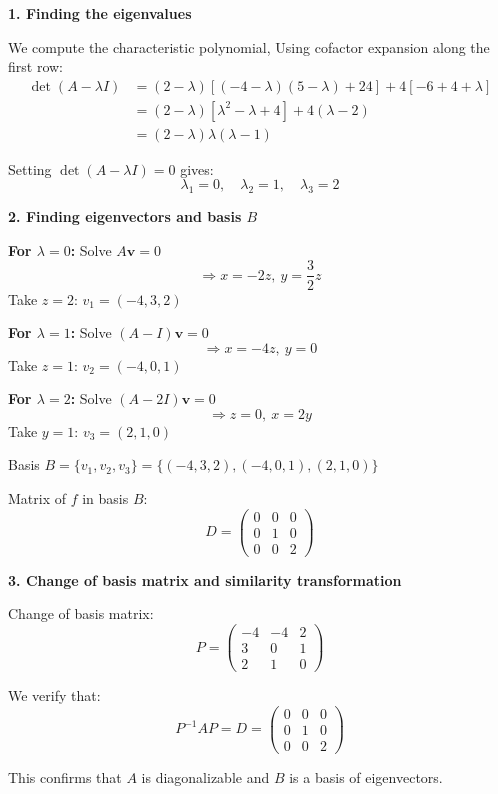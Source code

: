 \documentclass[12pt]{article}
\begin{document}
\begin{correctionbox}
    \noindent \textbf{1. Finding the eigenvalues}

We compute the characteristic polynomial, Using cofactor expansion along the first row:
\begin{align*}
\det(A - \lambda I) &= (2-\lambda)\left[(-4-\lambda)(5-\lambda) + 24\right] + 4\left[-6 + 4 + \lambda\right] \\
&= (2-\lambda)\left[\lambda^2 - \lambda + 4\right] + 4(\lambda - 2) \\
&= (2-\lambda)\lambda(\lambda - 1)
\end{align*}

Setting \(\det(A - \lambda I) = 0\) gives:
\[
\lambda_1 = 0, \quad \lambda_2 = 1, \quad \lambda_3 = 2
\]

\noindent \textbf{2. Finding eigenvectors and basis \(B\)}

\textbf{For \(\lambda = 0\):} Solve \(A\mathbf{v} = 0\)
\[
\Rightarrow x = -2z,\ y = \frac{3}{2}z
\]
Take \(z = 2\): \(v_1 = (-4, 3, 2)\)

\textbf{For \(\lambda = 1\):} Solve \((A - I)\mathbf{v} = 0\)
\[
\Rightarrow x = -4z,\ y = 0
\]
Take \(z = 1\): \(v_2 = (-4, 0, 1)\)

\textbf{For \(\lambda = 2\):} Solve \((A - 2I)\mathbf{v} = 0\)
\[
\Rightarrow z = 0,\ x = 2y
\]
Take \(y = 1\): \(v_3 = (2, 1, 0)\)

Basis \(B = \{v_1, v_2, v_3\} = \{(-4,3,2), (-4,0,1), (2,1,0)\}\)

Matrix of \(f\) in basis \(B\):
\[
D = \begin{pmatrix}
0 & 0 & 0 \\
0 & 1 & 0 \\
0 & 0 & 2
\end{pmatrix}
\]

\noindent \textbf{3. Change of basis matrix and similarity transformation}

Change of basis matrix:
\[
P = \begin{pmatrix}
-4 & -4 & 2 \\
3 & 0 & 1 \\
2 & 1 & 0
\end{pmatrix}
\]

We verify that:
\[
P^{-1}AP = D = \begin{pmatrix}
0 & 0 & 0 \\
0 & 1 & 0 \\
0 & 0 & 2
\end{pmatrix}
\]

This confirms that \(A\) is diagonalizable and \(B\) is a basis of eigenvectors.
\end{correctionbox}
\end{document}
